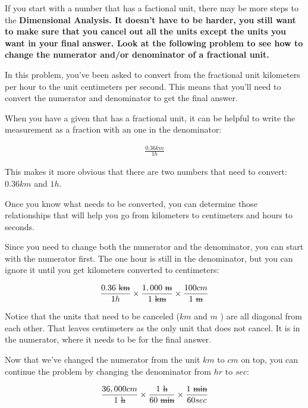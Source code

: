 \begin{example}
	If you start with a number that has a
	factional unit, there may be more steps to the \bf{Dimensional Analysis}.
	It doesn't have to be harder, you still want to make sure that you cancel out
	all the units except the units you want in your final answer. Look at the
	following problem to see how to change the numerator and/or denominator of a
	fractional unit.

	In this problem, you've been asked to convert from the fractional unit
	kilometers per hour to the unit centimeters per second. This means that
	you'll need to convert the numerator and denominator to get the final answer.

	When you have a given that has a fractional unit, it can be helpful to write
	the measurement as a fraction with an one in the denominator:

    \begin{align}
    	\frac{0.36 km}{1 h}
    \end{align}

	This makes it more obvious that there are two numbers that need to convert:
	$0.36 km$ and $1 h$.

	Once you know what needs to be converted, you can determine those
	relationships that will help you go from kilometers to centimeters and hours
	to seconds.

	Since you need to change both the numerator and the denominator, you can
	start with the numerator first. The one hour is still in the denominator, but
	you can ignore it until you get kilometers converted to centimeters:

    \begin{align}
    	\frac{0.36 \rm{ \sout{km}}}{1 h} \times \frac{1,000 \rm{ \sout{m}}}{1 \rm{ \sout{km}}} \times \frac{100 cm}{1 \rm{ \sout{m}}}
    \end{align}

	Notice that the units that need to be canceled ($km$ and $m$ ) are all
	diagonal from each other. That leaves centimeters as the only unit that does
	not cancel. It is in the numerator, where it needs to be for the final
	answer.

	Now that we've changed the numerator from the unit $km$ to $cm$ on top, you
	can continue the problem by changing the denominator from $hr$ to $sec$:

    \begin{align}
    	\frac{36,000 cm}{1 \rm{ \sout{h}}} \times \frac{1 \rm{ \sout{h}}}{60 \rm{ \sout{min}}} \times \frac{1 \rm{ \sout{min}}}{60 sec}
    \end{align}


\end{example}
